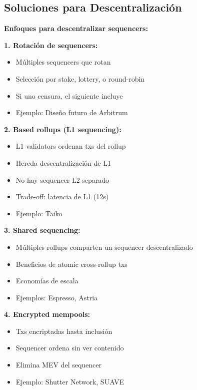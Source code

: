 \documentclass[11pt,a4paper,twoside,openright]{book}
\theoremstyle{definition}
\theoremstyle{plain}
\theoremstyle{remark}
\begin{document}
\subsection{Soluciones para Descentralización}

\begin{keyidea}
\textbf{Enfoques para descentralizar sequencers:}

\textbf{1. Rotación de sequencers:}
\begin{itemize}
    \item Múltiples sequencers que rotan
    \item Selección por stake, lottery, o round-robin
    \item Si uno censura, el siguiente incluye
    \item Ejemplo: Diseño futuro de Arbitrum
\end{itemize}

\textbf{2. Based rollups (L1 sequencing):}
\begin{itemize}
    \item L1 validators ordenan txs del rollup
    \item Hereda descentralización de L1
    \item No hay sequencer L2 separado
    \item Trade-off: latencia de L1 (12s)
    \item Ejemplo: Taiko
\end{itemize}

\textbf{3. Shared sequencing:}
\begin{itemize}
    \item Múltiples rollups comparten un sequencer descentralizado
    \item Beneficios de atomic cross-rollup txs
    \item Economías de escala
    \item Ejemplos: Espresso, Astria
\end{itemize}

\textbf{4. Encrypted mempools:}
\begin{itemize}
    \item Txs encriptadas hasta inclusión
    \item Sequencer ordena sin ver contenido
    \item Elimina MEV del sequencer
    \item Ejemplo: Shutter Network, SUAVE
\end{itemize}
\end{keyidea}
\end{document}
